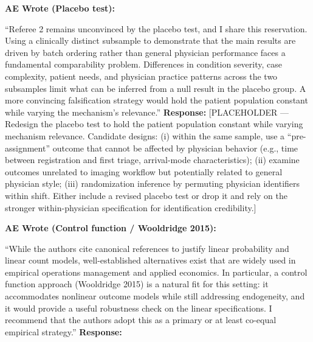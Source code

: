 \documentclass[11pt]{article}
\newenvironment{quote2}
{ \bigskip
\noindent
         \small\em
         \baselineskip=14pt
}
\newcommand{\1}{\hbox{\rm 1\kern-.35em 1}}
\begin{document}
\begin{quote2}
\textbf{AE Wrote (Placebo test):}

\noindent ``Referee 2 remains unconvinced by the placebo test, and I share this reservation. Using a clinically distinct subsample to demonstrate that the main results are driven by batch ordering rather than general physician performance faces a fundamental comparability problem. Differences in condition severity, case complexity, patient needs, and physician practice patterns across the two subsamples limit what can be inferred from a null result in the placebo group. A more convincing falsification strategy would hold the patient population constant while varying the mechanism's relevance.''
\end{quote2}

\noindent\textbf{Response:} \color{blue}[PLACEHOLDER --- Redesign the placebo test to hold the patient population constant while varying mechanism relevance. Candidate designs: (i) within the same sample, use a ``pre-assignment'' outcome that cannot be affected by physician behavior (e.g., time between registration and first triage, arrival-mode characteristics); (ii) examine outcomes unrelated to imaging workflow but potentially related to general physician style; (iii) randomization inference by permuting physician identifiers within shift. Either include a revised placebo test or drop it and rely on the stronger within-physician specification for identification credibility.]
\color{black}

\begin{quote2}
\textbf{AE Wrote (Control function / Wooldridge 2015):}

\noindent ``While the authors cite canonical references to justify linear probability and linear count models, well-established alternatives exist that are widely used in empirical operations management and applied economics. In particular, a control function approach (Wooldridge 2015) is a natural fit for this setting: it accommodates nonlinear outcome models while still addressing endogeneity, and it would provide a useful robustness check on the linear specifications. I recommend that the authors adopt this as a primary or at least co-equal empirical strategy.''
\end{quote2}

\noindent\textbf{Response:} \color{blue}
\color{black}
\end{document}
